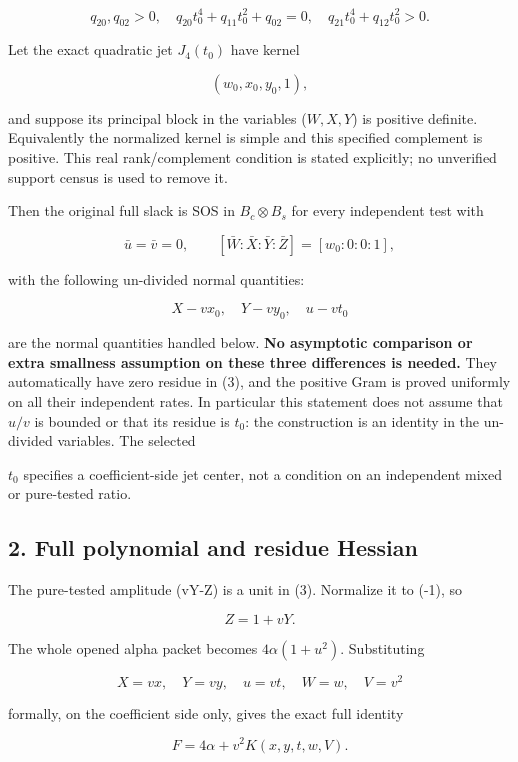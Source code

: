 \[
q_{20},q_{02}>0,\quad
q_{20}t_0^4+q_{11}t_0^2+q_{02}=0,
\quad q_{21}t_0^4+q_{12}t_0^2>0.
\tag{2}
\]

Let the exact quadratic jet \(J_4(t_0)\) have kernel

\[
(w_0,x_0,y_0,1),
\]

and suppose its principal block in the variables (\(W,X,Y\)) is positive
definite. Equivalently the normalized kernel is simple and this specified
complement is positive. This real rank/complement condition is stated
explicitly; no unverified support census is used to remove it.

Then the original full slack is SOS in \(B_c\otimes B_s\) for every
independent test with

\[
\bar u=\bar v=0,\qquad
[\bar W:\bar X:\bar Y:\bar Z]=[w_0:0:0:1],
\tag{3}
\]

with the following un-divided normal quantities:

\[
X-vx_0,\quad Y-vy_0,\quad u-vt_0
\]

are the normal quantities handled below. \textbf{No asymptotic comparison or
extra smallness assumption on these three differences is needed.} They
automatically have zero residue in (3), and the positive Gram is proved
uniformly on all their independent rates. In particular this statement
does not assume that \(u/v\) is bounded or that its residue is \(t_0\): the
construction is an identity in the un-divided variables. The selected

\(t_0\) specifies a coefficient-side jet center, not a condition on an
independent mixed or pure-tested ratio.

\hypertarget{full-polynomial-and-residue-hessian}{%
\subsection{2. Full polynomial and residue Hessian}\label{p03b551f2a9a0:full-polynomial-and-residue-hessian}}

The pure-tested amplitude (vY-Z) is a unit in (3). Normalize it to (-1),
so

\[
Z=1+vY.
\]

The whole opened alpha packet becomes \(4\alpha(1+u^2)\). Substituting

\[
X=vx,\quad Y=vy,\quad u=vt,\quad W=w,\quad V=v^2
\]

formally, on the coefficient side only, gives the exact full identity

\[
F=4\alpha+v^2K(x,y,t,w,V).
\tag{4}
\]

